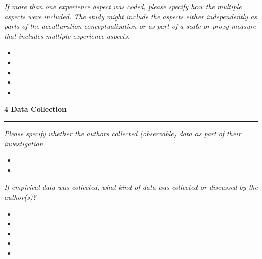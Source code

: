 \documentclass[10pt,a4paper]{protocol}
\newcommand\category[2]{
{\Large\bfseries\color{emphasis} \vspace{0.25em} #1 \hspace{0.5em} #2 \\ [-0.6em] \rule{\textwidth}{0.4pt} \vspace{0.25em}}
}
\begin{document}
\textit{If more than one experience aspect was coded, please specify how the multiple aspects were included. The study might include the aspects either independently as parts of the acculturation conceptualization or as part of a scale or proxy measure that includes multiple experience aspects.}
\vspace{0.5em}
\begin{itemize}
	\item {}
	\item {}
	\item {}
	\item {}
	\item {}
\end{itemize}
\divider

\category{4}{Data Collection}

\textit{Please specify whether the authors collected (observable) data as part of their investigation.}
\vspace{0.5em}
\begin{itemize}
	\item {}
	\item {}
\end{itemize}
\divider

\clearpage
\vspace*{2em}

\textit{If empirical data was collected, what kind of data was collected or discussed by the author(s)?}
\vspace{0.5em}
\begin{itemize}
	\item {}
	\item {}
	\item {}
	\item {}
	\item {}
\end{itemize}
\divider
\end{document}
